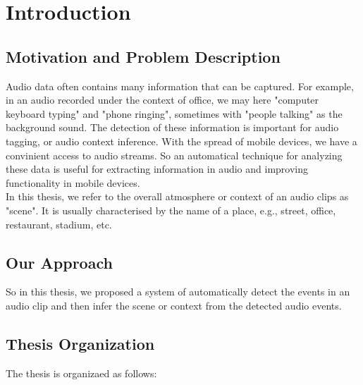 
\chapter{Introduction}

\section{Motivation and Problem Description}
Audio data often contains many information that can be captured. For example, in an audio recorded under the context of office, we may here "computer keyboard typing" and "phone ringing", sometimes with "people talking" as the background sound. The detection of these information is important for audio tagging, or audio context inference. With the spread of mobile devices, we have a convinient access to audio streams. So an automatical technique for analyzing these data is useful for extracting information in audio and improving functionality in mobile devices. \\ 
In this thesis, we refer to the overall atmosphere or context of an audio clips as "scene". It is usually characterised by the name of a place, e.g., street, office, restaurant, stadium, etc. 

\section{Our Approach}
So in this thesis, we proposed a system of automatically detect the events in an audio clip and then infer the scene or context from the detected audio events. 

\section{Thesis Organization}
The thesis is organizaed as follows: 

